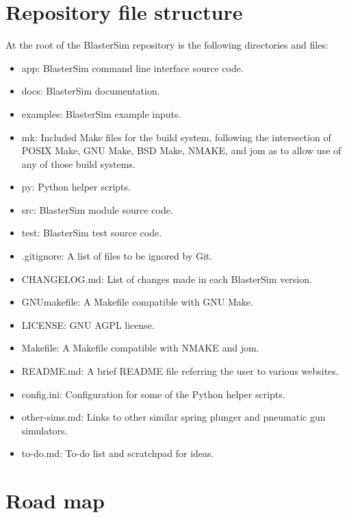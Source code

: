 
\section{Repository file structure}\label{file-structure}

At the root of the BlasterSim repository is the following directories and files:

\begin{itemize}
    \item app: BlasterSim command line interface source code.
    \item docs: BlasterSim documentation.
    \item examples: BlasterSim example inputs.
    \item mk: Included Make files for the build system, following the intersection of POSIX Make, GNU Make, BSD Make, NMAKE, and jom as to allow use of any of those build systems.
    \item py: Python helper scripts.
    \item src: BlasterSim module source code.
    \item test: BlasterSim test source code.
    \item .gitignore: A list of files to be ignored by Git. %
    \item CHANGELOG.md: List of changes made in each BlasterSim version.
    \item GNUmakefile: A Makefile compatible with GNU Make.
    \item LICENSE\@: GNU AGPL license.
    \item Makefile: A Makefile compatible with NMAKE and jom.
    \item README.md: A brief README file referring the user to various websites.
    \item config.ini: Configuration for some of the Python helper scripts.
    \item other-sims.md: Links to other similar spring plunger and pneumatic gun simulators.
    \item to-do.md: To-do list and scratchpad for ideas.
\end{itemize}

\section{Road map}\label{road-map}

